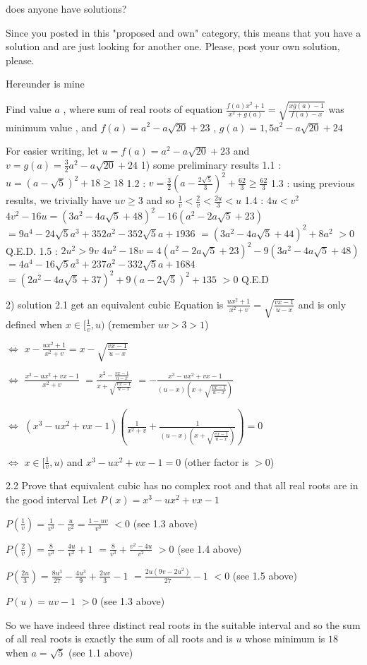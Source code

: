 \begin{solution}
	\begin{tcolorbox}does anyone have solutions?\end{tcolorbox}
Since you posted in this "proposed and own" category, this means that you have a solution and are just looking for another one.
Please, post your own solution, please.

Hereunder is mine

\begin{tcolorbox}Find value $a$ , where sum of real roots of equation $\frac{f(a)x^2 +1}{x^2+g(a)}=\sqrt{\frac{xg(a)-1}{f(a)-x}}$ was minimum value , and $f(a)=a^2-a\sqrt{20} +23$ , $g(a)=1,5a^2-a\sqrt{20}+24$\end{tcolorbox}
For easier writing, let $u=f(a)=a^2-a\sqrt{20}+23$ and $v=g(a)=\frac 32a^2-a\sqrt{20}+24$
1) some preliminary results
1.1 : $u=(a-\sqrt 5)^2+18\ge 18$
1.2 : $v=\frac 32(a-\frac{2\sqrt 5}3)^2+\frac{62}3\ge \frac{62}3$
1.3 : using previous results, we trivially have $uv\ge 3$ and so $\frac 1v<\frac 2v<\frac {2u}3<u$
1.4 : $4u < v^2$
$4v^2-16u=(3a^2-4a\sqrt{5}+48)^2-16(a^2-2a\sqrt{5}+23)$ $=9a^4-24\sqrt 5a^3+352a^2-352\sqrt 5a+1936$
$=(3a^2-4a\sqrt 5+44)^2+8a^2$ $>0$
Q.E.D.
1.5 : $2u^2 > 9v$
$4u^2-18v=4(a^2-2a\sqrt 5+23)^2-9(3a^2-4a\sqrt 5+48)$ $=4a^4-16\sqrt 5a^3+237a^2-332\sqrt 5a+1684$
$=(2a^2-4a\sqrt 5+37)^2+9(a-2\sqrt 5)^2+135$ $>0$
Q.E.D

2) solution
2.1 get an equivalent cubic
Equation is $\frac{ux^2+1}{x^2+v}=\sqrt{\frac{vx-1}{u-x}}$ and is only defined when $x\in[\frac 1v,u)$ (remember $uv>3>1$)

$\iff$ $x-\frac{ux^2+1}{x^2+v}=x-\sqrt{\frac{vx-1}{u-x}}$

$\iff$ $\frac{x^3-ux^2+vx-1}{x^2+v}$ $=\frac{x^2-\frac{vx-1}{u-x}}{x+\sqrt{\frac{vx-1}{u-x}}}$ $=-\frac{x^3-ux^2+vx-1}{(u-x)(x+\sqrt{\frac{vx-1}{u-x}})}$

$\iff$ $(x^3-ux^2+vx-1)\left(\frac 1{x^2+v}+\frac{1}{(u-x)(x+\sqrt{\frac{vx-1}{u-x}})}\right)=0$

$\iff$ $x\in[\frac 1v,u)$ and $x^3-ux^2+vx-1=0$ (other factor is $>0$)

2.2 Prove that equivalent cubic has no complex root and that all real roots are in the good interval
Let $P(x)=x^3-ux^2+vx-1$

$P(\frac 1v)=\frac 1{v^3}-\frac u{v^2}=\frac{1-uv}{v^3}$ $<0$ (see 1.3 above)

$P(\frac 2v)=\frac 8{v^3}-\frac{4u}{v^2}+1$ $=\frac 8{v^3}+\frac {v^2-4u}{v^2}$ $>0$ (see 1.4 above)

$P(\frac{2u}3)=\frac{8u^3}{27}-\frac{4u^3}9+\frac{2uv}3-1$ $=\frac{2u(9v-2u^2)}{27}-1$ $<0$ (see 1.5 above)

$P(u)=uv-1$ $>0$ (see 1.3 above)

So we have indeed three distinct real roots in the suitable interval and so the sum of all real roots is exactly the sum of all roots and  is $u$ whose minimum is $18$ when $\boxed{a=\sqrt 5}$ (see 1.1 above)
\end{solution}




